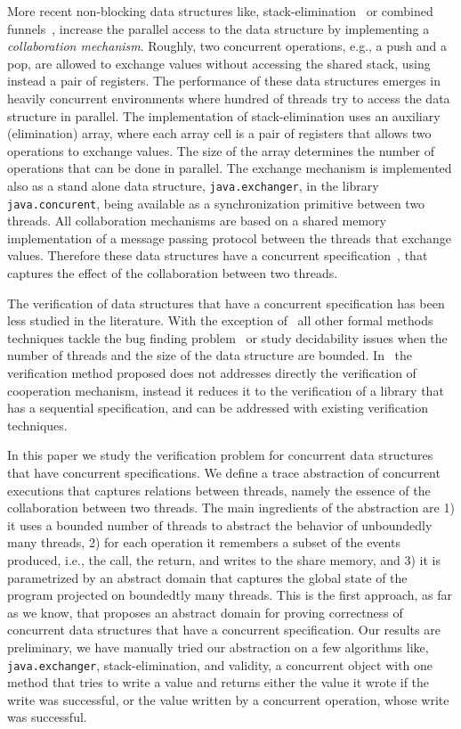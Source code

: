 More recent non-blocking data structures like, stack-elimination~\cite{elimination} or combined funnels~\cite{ShavitZ98}, increase the parallel access to the data structure by implementing a {\em collaboration mechanism}. Roughly, two concurrent operations, e.g., a push and a pop, are allowed to exchange values without accessing the shared stack, using instead a pair of registers. The performance of these data structures emerges in heavily concurrent environments  where hundred of threads try to access the data structure in parallel. The implementation  of stack-elimination uses an auxiliary (elimination) array, where each array cell is a pair of registers that allows two operations to exchange values. The size of the array determines the number of operations that can be done in parallel.  
The exchange mechanism is implemented also as a stand alone data structure, \texttt{java.exchanger}, in the library \texttt{java.concurent}, being available as a synchronization primitive between two threads. 
All collaboration mechanisms are based on a shared memory implementation of a message passing protocol between the threads that exchange values. 
Therefore these data structures have a concurrent specification~\cite{disc15}, that captures the effect of the collaboration between two threads. 

The verification of data structures that have a concurrent specification has been less studied in the literature. With the exception of~\cite{cav13} all other formal methods techniques tackle the bug finding problem~\cite{ee1,ee2} or study decidability issues when the number of threads and the size of the data structure are bounded. In~\cite{cav13} the verification method proposed does not addresses directly the verification of cooperation mechanism, instead it reduces it to the verification of a library that has a sequential specification, and can be addressed with existing verification techniques. 



In this paper we study the verification problem for concurrent data structures that have concurrent specifications. We define a trace abstraction of concurrent executions that captures relations between threads, namely the essence of the collaboration between two threads. 
The main ingredients of the abstraction are 1) it uses a bounded number of threads to abstract the behavior of unboundedly many  threads,  2) for each operation it remembers a subset of the events produced, i.e., the call, the return, and writes to the share memory, and 
 3) it is parametrized by an abstract domain that captures the global state of the program projected on boundedtly many threads. 
This is the first approach, as far as we know, that proposes an abstract domain for proving correctness of concurrent data structures that have a concurrent specification.  Our results are preliminary, we have manually tried our abstraction on a few algorithms like, \texttt{java.exchanger}, stack-elimination, and validity, a concurrent object with one method that tries to write a value and returns either the value it wrote if the write was successful, or the value written by a concurrent operation, whose write was successful.   
 
